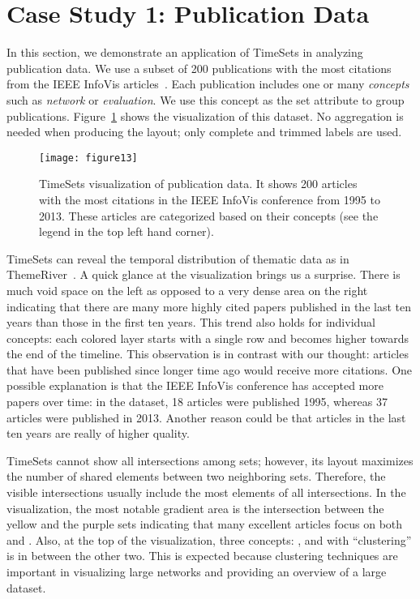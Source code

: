 \section{Case Study 1: Publication Data}
In this section, we demonstrate an application of TimeSets in analyzing publication data. We use a subset of 200 publications with the most citations from the IEEE InfoVis articles~\cite{Stasko2013}. Each publication includes one or many \emph{concepts} such as \emph{network} or \emph{evaluation}. We use this concept as the set attribute to group publications. Figure~\ref{fig:citations} shows the visualization of this dataset. No aggregation is needed when producing the layout; only complete and trimmed labels are used.

\begin{figure}[!htb]
\centering
\texttt{[image: figure13]}
\caption{TimeSets visualization of publication data. It shows 200 articles with the most citations in the IEEE InfoVis conference from 1995 to 2013. These articles are categorized based on their concepts (see the legend in the top left hand corner).}
\label{fig:citations}
\end{figure}

TimeSets can reveal the temporal distribution of thematic data as in ThemeRiver~\cite{Havre2002}. A quick glance at the visualization brings us a surprise. There is much void space on the left as opposed to a very dense area on the right indicating that there are many more highly cited papers published in the last ten years than those in the first ten years. This trend also holds for individual concepts: each colored layer starts with a single row and becomes higher towards the end of the timeline. This observation is in contrast with our thought: articles that have been published since longer time ago would receive more citations. One possible explanation is that the IEEE InfoVis conference has accepted more papers over time: in the dataset, 18 articles were published 1995, whereas 37 articles were published in 2013. Another reason could be that articles in the last ten years are really of higher quality.

TimeSets cannot show all intersections among sets; however,  its layout maximizes the number of shared elements between two neighboring sets. Therefore, the visible intersections usually include the most elements of all intersections. In the visualization, the most notable gradient area is the intersection between the yellow and the purple sets indicating that many excellent articles focus on both \tsevaluation{} and \tsinteraction. Also, at the top of the visualization, three concepts: \tsnetwork, \tsclustering{} and \tsoverview{} with ``clustering'' is in between the other two. This is expected because clustering techniques are important in visualizing large networks and providing an  overview of a large dataset.

